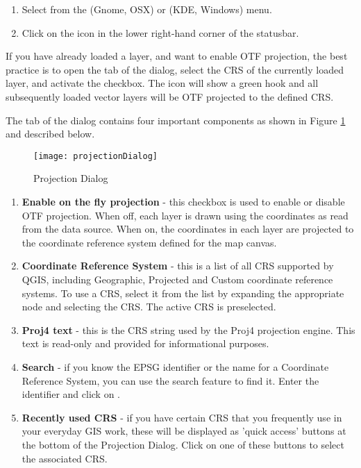 \begin{enumerate}
\item Select  from the
 (Gnome, OSX) or  (KDE, Windows) menu.
\item Click on the  icon in the
lower right-hand corner of the statusbar.
\end{enumerate}

If you have already loaded a layer, and want to enable OTF projection, the
best practice is to open the  tab of the
 dialog, select the CRS of the currently loaded
layer, and activate the  checkbox. The
 icon will show a green hook
and all subsequently loaded vector layers will be OTF projected to the
defined CRS.
 
The  tab of the 
dialog contains four important components as shown in Figure
\ref{fig:projections} and described below.

\begin{figure}[ht]
   \centering
   \caption{Projection Dialog \nixcaption}\label{fig:projections}\smallskip
   \texttt{[image: projectionDialog]}
\end{figure}

\begin{enumerate}
\item \textbf{Enable on the fly projection} -
this checkbox is used to enable or disable OTF projection. When off, each
layer is drawn using the coordinates as read from the data source. When on,
the coordinates in each layer are projected to the coordinate reference
system defined for the map canvas.
\item \textbf{Coordinate Reference System} - this is a list of all CRS
supported by QGIS, including Geographic, Projected and Custom coordinate
reference systems. To use a CRS, select it from the list by expanding
the appropriate node and selecting the CRS. The active CRS is preselected.
\item \textbf{Proj4 text} - this is the CRS string used by the Proj4
projection engine. This text is read-only and provided for informational
purposes.
\item \textbf{Search} - if you know the EPSG identifier or the name 
for a Coordinate Reference System, you can use the search feature to find it.
Enter the identifier and click on .
\item \textbf{Recently used CRS} - if you have certain CRS that you frequently 
use in your everyday GIS work, these will be displayed as 'quick access' buttons 
at the bottom of the Projection Dialog. Click on one of these buttons to select 
the associated CRS.
\end{enumerate}

